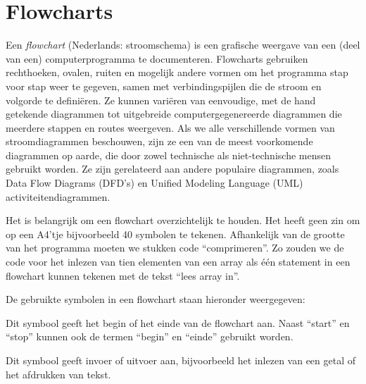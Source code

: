 \chapter{Flowcharts}
\thispagestyle{empty}
\label{cha:flowcharts}

Een \textsl{flowchart} (Nederlands: stroomschema)
is een grafische weergave van een (deel van een) computerprogramma te documenteren.
Flowcharts gebruiken rechthoeken, ovalen, ruiten en mogelijk andere vormen om het programma stap voor stap weer te gegeven, samen met verbindingspijlen die de stroom en volgorde te definiëren. Ze
kunnen variëren van eenvoudige, met de hand getekende diagrammen tot uitgebreide
computergegenereerde diagrammen die meerdere stappen en routes weergeven. Als we alle
verschillende vormen van stroomdiagrammen beschouwen, zijn ze een van de meest
voorkomende diagrammen op aarde, die door zowel technische als niet-technische mensen
gebruikt worden. Ze zijn gerelateerd aan andere
populaire diagrammen, zoals Data Flow Diagrams (DFD's) en Unified Modeling Language
(UML) activiteitendiagrammen.

Het is belangrijk om een flowchart overzichtelijk te houden. Het heeft geen zin
om op een A4'tje bijvoorbeeld 40 symbolen te tekenen. Afhankelijk van de grootte
van het programma moeten we stukken code ``comprimeren''. Zo zouden we de code voor
het inlezen van tien elementen van een array als \'e\'en statement in een flowchart
kunnen tekenen met de tekst ``lees array in''.

De gebruikte symbolen in een flowchart staan hieronder weergegeven:

\medskip
\begin{minipage}[c]{0.3\textwidth}
\centering
{}
\end{minipage}\hfill%
\begin{minipage}[c]{0.68\textwidth}
Dit symbool geeft het begin of het einde van de flowchart aan. Naast ``start'' en ``stop'' kunnen ook de termen ``begin'' en ``einde'' gebruikt worden.
\end{minipage}
\bigskip

\begin{minipage}[c]{0.3\textwidth}
\centering
{}
\end{minipage}\hfill%
\begin{minipage}[c]{0.68\textwidth}
Dit symbool geeft invoer of uitvoer aan, bijvoorbeeld het inlezen van een getal of het afdrukken van tekst.\end{minipage}
\bigskip

